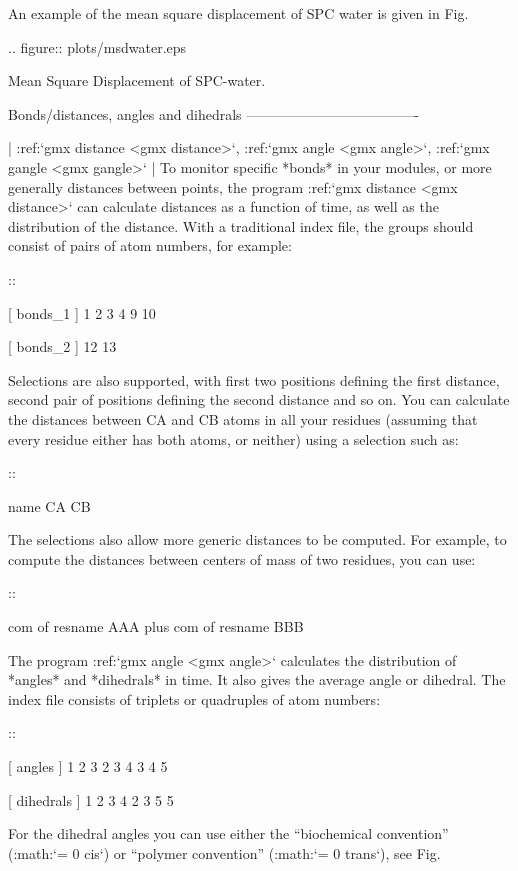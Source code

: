 An example of the mean square displacement of SPC water is given in
Fig. 

.. figure:: plots/msdwater.eps

    Mean Square Displacement of SPC-water.

Bonds/distances, angles and dihedrals
-------------------------------------

| :ref:`gmx distance <gmx distance>`, :ref:`gmx angle <gmx angle>`, 
  :ref:`gmx gangle <gmx gangle>`
| To monitor specific *bonds* in your modules, or more generally
  distances between points, the program 
  :ref:`gmx distance <gmx distance>` can calculate distances as a
  function of time, as well as the distribution of the distance. With a
  traditional index file, the groups should consist of pairs of atom
  numbers, for example:

::

    [ bonds_1 ]
     1     2
     3     4
     9    10

    [ bonds_2 ]
    12    13

Selections are also supported, with first two positions defining the
first distance, second pair of positions defining the second distance
and so on. You can calculate the distances between CA and CB atoms in
all your residues (assuming that every residue either has both atoms, or
neither) using a selection such as:

::

    name CA CB

The selections also allow more generic distances to be computed. For
example, to compute the distances between centers of mass of two
residues, you can use:

::

    com of resname AAA plus com of resname BBB

The program :ref:`gmx angle <gmx angle>`
calculates the distribution of *angles* and *dihedrals* in time. It also
gives the average angle or dihedral. The index file consists of triplets
or quadruples of atom numbers:

::

    [ angles ]
     1     2     3
     2     3     4
     3     4     5

    [ dihedrals ]
     1     2     3     4
     2     3     5     5

For the dihedral angles you can use either the “biochemical convention”
(:math:`\phi = 0 \equiv cis`) or “polymer convention”
(:math:`\phi = 0 \equiv trans`), see
Fig.

